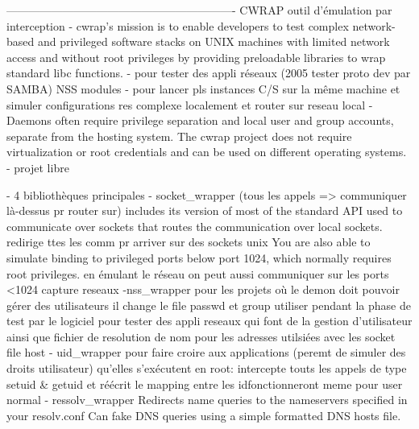 -------------------------------------------------------------
CWRAP outil d'émulation par interception
- cwrap's mission is to enable developers to test complex network-based and privileged software stacks on UNIX machines with limited network access and without root privileges by providing preloadable libraries to wrap standard libc functions.
- pour tester des appli réseaux (2005 tester proto dev par SAMBA) NSS modules
- pour lancer pls instances C/S sur la même machine et simuler configurations res complexe localement et router sur reseau local
- Daemons often require privilege separation and local user and group accounts, separate from the hosting system. The cwrap project does not require virtualization or root credentials and can be used on different operating systems.
- projet libre                  

- 4 bibliothèques principales
- socket\_wrapper (tous les appels => communiquer là-dessus pr router sur)
includes its version of most of the standard API used to communicate over sockets that routes the communication over local sockets.
redirige ttes les comm pr arriver sur des sockets unix
You are also able to simulate binding to privileged ports below port 1024, which normally requires root privileges.
en émulant le réseau on peut aussi communiquer sur les ports <1024
capture reseaux
-nss\_wrapper pour les projets où le demon doit pouvoir gérer des utilisateurs
il change le file passwd et group utiliser pendant la phase de test par le logiciel
pour tester des appli reseaux qui font de la gestion d'utilisateur ainsi que fichier de resolution de nom pour les adresses utilsiées avec les socket file host
- uid\_wrapper pour faire croire aux applications (peremt de simuler des droits utilisateur) qu'elles s'exécutent en root:
intercepte touts les appels de type setuid & getuid et réécrit le mapping entre les idfonctionneront meme pour user normal 
- ressolv\_wrapper
Redirects name queries to the nameservers specified in your resolv.conf
Can fake DNS queries using a simple formatted DNS hosts file.


